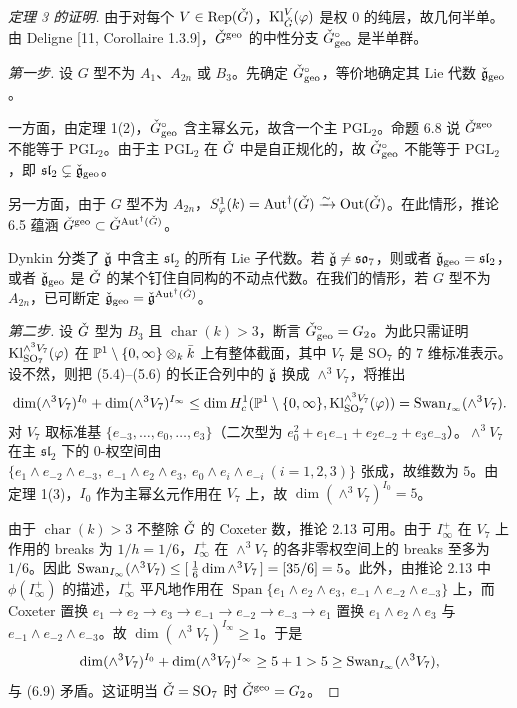 \begin{proof}[定理 3 的证明]
由于对每个 $V\in\mathrm{Rep}(\check G)$，$\mathrm{Kl}^V_{\check G}(\varphi)$ 是权 $0$ 的纯层，故几何半单。由 Deligne [11, Corollaire 1.3.9]，$\check G^{\mathrm{geo}}$ 的中性分支 $\check G^\circ_{\mathrm{geo}}$ 是半单群。

\emph{第一步.} 设 $G$ 型不为 $A_1$、$A_{2n}$ 或 $B_3$。先确定 $\check G^\circ_{\mathrm{geo}}$，等价地确定其 Lie 代数 $\check{\mathfrak g}_{\mathrm{geo}}$。

一方面，由定理 1(2)，$\check G^\circ_{\mathrm{geo}}$ 含主幂幺元，故含一个主 $\mathrm{PGL}_2$。命题 6.8 说 $\check G^{\mathrm{geo}}$ 不能等于 $\mathrm{PGL}_2$。由于主 $\mathrm{PGL}_2$ 在 $\check G$ 中是自正规化的，故 $\check G^\circ_{\mathrm{geo}}$ 不能等于 $\mathrm{PGL}_2$，即 $\mathfrak{sl}_2\subsetneq\check{\mathfrak g}_{\mathrm{geo}}$。

另一方面，由于 $G$ 型不为 $A_{2n}$，$S^1_\varphi(k)=\operatorname{Aut}^\dagger(\check G)\xrightarrow{\sim}\operatorname{Out}(\check G)$。在此情形，推论 6.5 蕴涵 $\check G^{\mathrm{geo}}\subset\check G^{\operatorname{Aut}^\dagger(\check G)}$。

Dynkin 分类了 $\check{\mathfrak g}$ 中含主 $\mathfrak{sl}_2$ 的所有 Lie 子代数。若 $\check{\mathfrak g}\neq\mathfrak{so}_7$，则或者 $\check{\mathfrak g}_{\mathrm{geo}}=\mathfrak{sl}_2$，或者 $\check{\mathfrak g}_{\mathrm{geo}}$ 是 $\check G$ 的某个钉住自同构的不动点代数。在我们的情形，若 $G$ 型不为 $A_{2n}$，已可断定 $\check{\mathfrak g}_{\mathrm{geo}}=\check{\mathfrak g}^{\operatorname{Aut}^\dagger(\check G)}$。

\emph{第二步.} 设 $\check G$ 型为 $B_3$ 且 $\operatorname{char}(k)>3$，断言 $\check G^\circ_{\mathrm{geo}}=G_2$。为此只需证明 $\mathrm{Kl}^{\wedge^3V_7}_{\mathrm{SO}_7}(\varphi)$ 在 $\mathbb{P}^1\setminus\{0,\infty\}\otimes_k\bar k$ 上有整体截面，其中 $V_7$ 是 $\mathrm{SO}_7$ 的 $7$ 维标准表示。设不然，则把 (5.4)–(5.6) 的长正合列中的 $\check{\mathfrak g}$ 换成 $\wedge^3V_7$，将推出
\begin{equation}
\dim(\wedge^3V_7)^{I_0}+\dim(\wedge^3V_7)^{I_\infty}\le\dim H^1_c(\mathbb{P}^1\setminus\{0,\infty\},\mathrm{Kl}^{\wedge^3V_7}_{\mathrm{SO}_7}(\varphi))=\mathrm{Swan}_{I_\infty}(\wedge^3V_7).
\end{equation}
对 $V_7$ 取标准基 $\{e_{-3},\dots,e_0,\dots,e_3\}$（二次型为 $e_0^2+e_1e_{-1}+e_2e_{-2}+e_3e_{-3}$）。$\wedge^3V_7$ 在主 $\mathfrak{sl}_2$ 下的 $0$-权空间由 $\{e_1\wedge e_{-2}\wedge e_{-3},\ e_{-1}\wedge e_2\wedge e_3,\ e_0\wedge e_i\wedge e_{-i}\ (i=1,2,3)\}$ 张成，故维数为 $5$。由定理 1(3)，$I_0$ 作为主幂幺元作用在 $V_7$ 上，故 $\dim(\wedge^3V_7)^{I_0}=5$。

由于 $\operatorname{char}(k)>3$ 不整除 $\check G$ 的 Coxeter 数，推论 2.13 可用。由于 $I^+_\infty$ 在 $V_7$ 上作用的 breaks 为 $1/h=1/6$，$I^+_\infty$ 在 $\wedge^3V_7$ 的各非零权空间上的 breaks 至多为 $1/6$。因此 $\mathrm{Swan}_{I_\infty}(\wedge^3V_7)\le[\,\tfrac16\dim\wedge^3V_7\,]=[35/6]=5$。此外，由推论 2.13 中 $\phi(I^+_\infty)$ 的描述，$I^+_\infty$ 平凡地作用在 $\operatorname{Span}\{e_1\wedge e_2\wedge e_3,\ e_{-1}\wedge e_{-2}\wedge e_{-3}\}$ 上，而 Coxeter 置换 $e_1\to e_2\to e_3\to e_{-1}\to e_{-2}\to e_{-3}\to e_1$ 置换 $e_1\wedge e_2\wedge e_3$ 与 $e_{-1}\wedge e_{-2}\wedge e_{-3}$。故 $\dim(\wedge^3V_7)^{I_\infty}\ge 1$。于是
\[
\dim(\wedge^3V_7)^{I_0}+\dim(\wedge^3V_7)^{I_\infty}\ge 5+1>5\ge\mathrm{Swan}_{I_\infty}(\wedge^3V_7),
\]
与 (6.9) 矛盾。这证明当 $\check G=\mathrm{SO}_7$ 时 $\check G^{\mathrm{geo}}=G_2$。


\end{proof}
